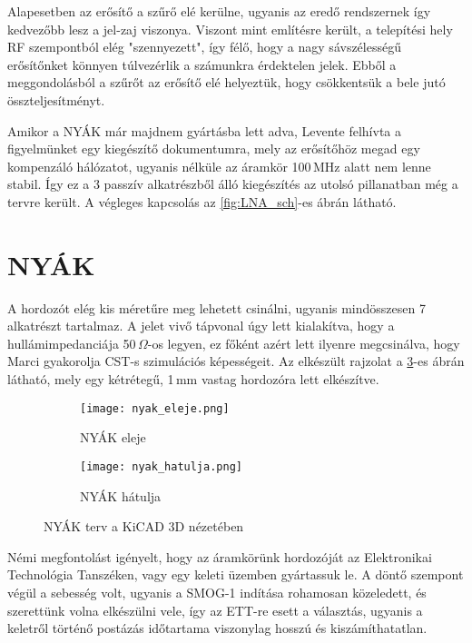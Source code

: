 Alapesetben az erősítő a szűrő elé kerülne, ugyanis az eredő rendszernek így kedvezőbb lesz a jel-zaj viszonya. Viszont mint említésre került, a telepítési hely RF szempontból elég "szennyezett", így félő, hogy a nagy sávszélességű erősítőnket könnyen túlvezérlik a számunkra érdektelen jelek. Ebből a meggondolásból a szűrőt az erősítő elé helyeztük, hogy csökkentsük a bele jutó összteljesítményt.

Amikor a NYÁK már majdnem gyártásba lett adva, Levente felhívta a figyelmünket egy kiegészítő dokumentumra\cite{PGA_comp}, mely az erősítőhöz megad egy kompenzáló hálózatot, ugyanis nélküle az áramkör 100\,MHz alatt nem lenne stabil. Így ez a 3 passzív alkatrészből álló kiegészítés az utolsó pillanatban még a tervre került. A végleges kapcsolás az \ref{fig:LNA_sch}-es ábrán látható.


\section*{NYÁK}

A hordozót elég kis méretűre meg lehetett csinálni, ugyanis mindösszesen 7 alkatrészt tartalmaz. A jelet vivő tápvonal úgy lett kialakítva, hogy a hullámimpedanciája 50\,$\Omega$-os legyen, ez főként azért lett ilyenre megcsinálva, hogy Marci gyakorolja CST-s szimulációs képességeit. Az elkészült rajzolat a \ref{fig:nyak}-es ábrán látható, mely egy kétrétegű, 1\,mm vastag hordozóra lett elkészítve.

\begin{figure}[!ht]
	\centering
	\begin{subfigure}[b]{0.49\textwidth}
		\texttt{[image: nyak\_eleje.png]}
		\caption{NYÁK eleje}
		\label{fig:nyak_elol}
	\end{subfigure}
	\begin{subfigure}[b]{0.49\textwidth}
		\texttt{[image: nyak\_hatulja.png]}
		\caption{NYÁK hátulja}
		\label{fig:nyak_hatul}
	\end{subfigure}
	\caption{NYÁK terv a KiCAD 3D nézetében}
	\label{fig:nyak}
\end{figure}

Némi megfontolást igényelt, hogy az áramkörünk hordozóját az Elektronikai Technológia Tanszéken, vagy egy keleti üzemben gyártassuk le. A döntő szempont végül a sebesség volt, ugyanis a SMOG-1 indítása rohamosan közeledett, és szerettünk volna elkészülni vele, így az ETT-re esett a választás, ugyanis a keletről történő postázás időtartama viszonylag hosszú és kiszámíthatatlan.


